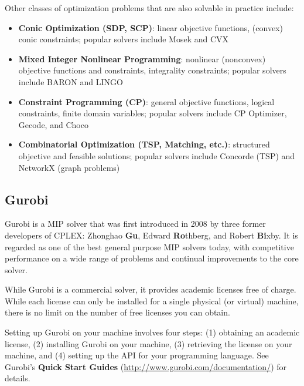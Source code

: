 \documentclass[12pt]{article}
\begin{document}
Other classes of optimization problems that are also solvable in practice include:
\begin{itemize}
    \item \textbf{Conic Optimization (SDP, SCP)}: linear objective functions, (convex) conic constraints; popular solvers include Mosek and CVX
    \item \textbf{Mixed Integer Nonlinear Programming}: nonlinear (nonconvex) objective functions and constraints, integrality constraints; popular solvers include BARON and LINGO
    \item \textbf{Constraint Programming (CP)}: general objective functions, logical constraints, finite domain variables; popular solvers include CP Optimizer, Gecode, and Choco
    \item \textbf{Combinatorial Optimization (TSP, Matching, etc.)}: structured objective and feasible solutions; popular solvers include Concorde (TSP) and NetworkX (graph problems)
\end{itemize}



\subsection{Gurobi}
Gurobi is a MIP solver that was first introduced in 2008 by three former developers of CPLEX: Zhonghao \textbf{Gu}, Edward \textbf{Ro}thberg, and Robert \textbf{Bi}xby.
It is regarded as one of the best general purpose MIP solvers today, with competitive performance on a wide range of problems and continual improvements to the core solver.

While Gurobi is a commercial solver, it provides academic licenses free of charge.
While each license can only be installed for a single physical (or virtual) machine, there is no limit on the number of free licenses you can obtain.

Setting up Gurobi on your machine involves four steps: (1) obtaining an academic license, (2) installing Gurobi on your machine, (3) retrieving the license on your machine, and (4) setting up the API for your programming language.
See Gurobi's \textbf{Quick Start Guides} (\url{http://www.gurobi.com/documentation/}) for details.
\end{document}
